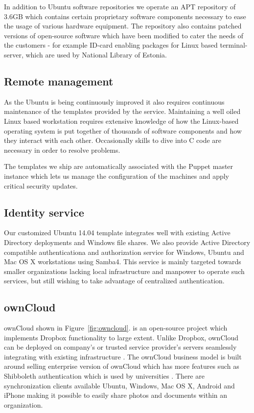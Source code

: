 \documentclass{article}
\begin{document}
In addition to Ubuntu software repositories
we operate an APT repository of 3.6GB which contains
certain proprietary software components necessary
to ease the usage of various hardware equipment.
The repository also contains patched versions of
open-source software which have been modified to cater the
needs of the customers - for example
ID-card enabling packages for Linux based terminal-server,
which are used by National Library of Estonia.

\subsection{Remote management}

As the Ubuntu is being continuously improved it also requires
continuous maintenance of the templates provided by the service.
Maintaining a well oiled Linux based workstation
requires extensive knowledge of
how the Linux-based operating system is put together of
thousands of software components and how they interact with each other.
Occasionally skills to dive into C code are necessary
in order to resolve problems.

The templates we ship are automatically associated with
the Puppet master instance which lets us manage
the configuration of the machines and apply critical security updates.


\subsection{Identity service}

Our customized Ubuntu 14.04 template integrates
well with existing Active Directory deployments
and Windows file shares.
We also provide Active Directory compatible
authenticationa and authorization service
for Windows, Ubuntu and Mac OS X workstations using Samba4.
This service is mainly targeted towards
smaller organizations lacking local
infrastructure and manpower to operate such services,
but still wishing to take advantage of centralized
authentication.

\subsection{ownCloud}

ownCloud shown in Figure~\ref{fig:owncloud}.
is an open-source project which implements
Dropbox functionality to large extent.
Unlike Dropbox, ownCloud can be deployed
on company's or trusted service provider's servers
seamlessly integrating with existing infrastructure
\cite{deploying-owncloud}.
The ownCloud business model is built around selling
enterprise version of ownCloud which has more features
such as Shibboleth authentication which is used by universities
\cite{owncloud-closes-2.5-million-usd}.
There are synchronization clients available
Ubuntu, Windows, Mac OS X, Android and iPhone
making it possible to easily share photos and documents within
an organization.
\end{document}
